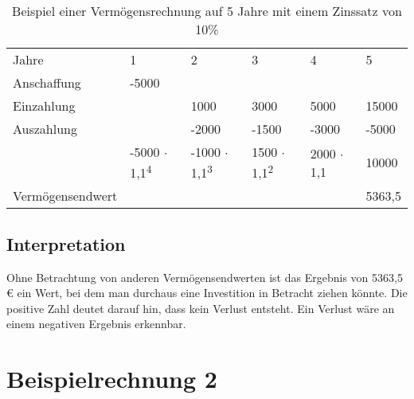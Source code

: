 \begin{table}[!h]
    \begin{tabular}{llllll}
        \cline{1-6} \rowcolor{gray}
        Jahre            & 1                                    & 2                                    & 3                                   & 4                & 5      \\ \cline{1-6} \rowcolor{white}
        Anschaffung      & -5000                                &                                      &                                     &                  &        \\ \cline{1-6} \rowcolor{white}
        Einzahlung       &                                      & 1000                                 & 3000                                & 5000             & 15000  \\ \cline{1-6} \rowcolor{white}
        Auszahlung       &                                      & -2000                                & -1500                               & -3000            & -5000  \\ \cline{1-6} \rowcolor{white}
                         & -5000 $\cdot$ 1,1\textsuperscript{4} & -1000 $\cdot$ 1,1\textsuperscript{3} & 1500 $\cdot$ 1,1\textsuperscript{2} & 2000 $\cdot$ 1,1 & 10000  \\ \rowcolor{white}
        Vermögensendwert &                                      &                                      &                                     &                  & 5363,5 \\ \cline{1-6}
    \end{tabular}
    \caption{Beispiel einer Vermögensrechnung auf 5 Jahre mit einem Zinssatz von 10\%}
    \label{tb:VermoegensendwertRechnung}
\end{table}

\subsection{Interpretation}

Ohne Betrachtung von anderen Vermögensendwerten ist das Ergebnis von 5363,5 € ein Wert, bei dem man durchaus eine Investition in Betracht ziehen könnte. Die positive Zahl deutet darauf hin, dass kein Verlust entsteht. Ein Verlust wäre an einem negativen Ergebnis erkennbar.

\section{Beispielrechnung 2}\label{beispielrechnungVer}

